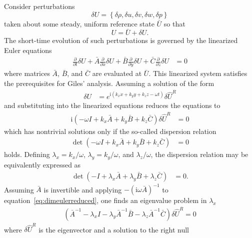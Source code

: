\documentclass[letterpaper,11pt,nointlimits,reqno,draft]{amsbook}
\newcommand{\ii}{\ensuremath{\mathrm{i}}}
\begin{document}
Consider perturbations
\[
\delta{}U = \left\{ \delta{}\rho, \delta{}u,
\delta{}v, \delta{}w, \delta{}p \right\}
\]
taken about some steady,
uniform reference state $\bar{U}$ so that
\[
U = \bar{U} + \delta{}U.
\]
The short-time evolution of such perturbations is governed by the linearized
Euler equations
\begin{align}
\label{eq:dimeulerperturb}
               \frac{\partial}{\partial{}t}\delta{}U
+ \bar{A} \frac{\partial}{\partial{}x}\delta{}U
+ \bar{B} \frac{\partial}{\partial{}y}\delta{}U
+ \bar{C} \frac{\partial}{\partial{}z}\delta{}U
&= 0
\end{align}
where matrices $\bar{A}$, $\bar{B}$, and $\bar{C}$ are evaluated
at $\bar{U}$.  This linearized system satisfies the prerequisites for
Giles' analysis.  Assuming a solution of the form
\begin{align}
  \delta{}U &= e^{\ii\left(
    k_x x + k_y y + k_z z - \omega t
  \right)}
  \delta\hat{U}^R
\end{align}
and substituting into the linearized equations reduces the equations to
\begin{align}
\label{eq:dimeulerreduced}
  \ii\left( - \omega I
            + k_x \bar{A}
            + k_y \bar{B}
            + k_z \bar{C}
  \right)
  \delta\hat{U}^R &= 0
\end{align}
which has nontrivial solutions only if the so-called dispersion relation
\begin{align}
  \det \left( - \omega I
              + k_x \bar{A}
              + k_y \bar{B}
              + k_z \bar{C}
       \right) &= 0
\end{align}
holds.  Defining $\lambda_x = k_x/\omega$, $\lambda_y = k_y/\omega$, and
$\lambda_z/\omega$, the dispersion relation may be equivalently expressed as
\begin{align}
\label{eq:dimeulerdisp}
  \det \left( - I
              + \lambda_x \bar{A}
              + \lambda_y \bar{B}
              + \lambda_z \bar{C}
       \right) &= 0
  .
\end{align}
Assuming $\bar{A}$ is invertible and applying
$-\left(\ii\omega{}\bar{A}\right)^{-1}$ to
equation~\eqref{eq:dimeulerreduced}, one finds an eigenvalue problem in
$\lambda_x$
\begin{align}
  \left(   \bar{A}^{-1}
         - \lambda_x I
         - \lambda_y \bar{A}^{-1} \bar{B}
         - \lambda_z \bar{A}^{-1} \bar{C}
  \right) \delta\hat{U}^R = 0
\end{align}
where $\delta\hat{U}^R$ is the eigenvector and a solution to the right null
\end{document}
